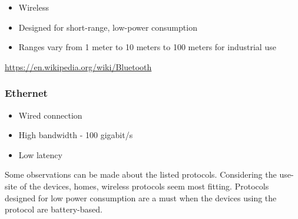 \begin{itemize}
\item Wireless
\item Designed for short-range, low-power consumption
\item Ranges vary from 1 meter to 10 meters to 100 meters for industrial use
\end{itemize}

\url{https://en.wikipedia.org/wiki/Bluetooth}

\subsubsection{Ethernet}

\begin{itemize}
\item Wired connection
\item High bandwidth - 100 gigabit/s
\item Low latency
\end{itemize}

Some observations can be made about the listed protocols. Considering the
use-site of the devices, homes, wireless protocols seem most fitting. Protocols
designed for low power consumption are a must when the devices using the
protocol are battery-based.